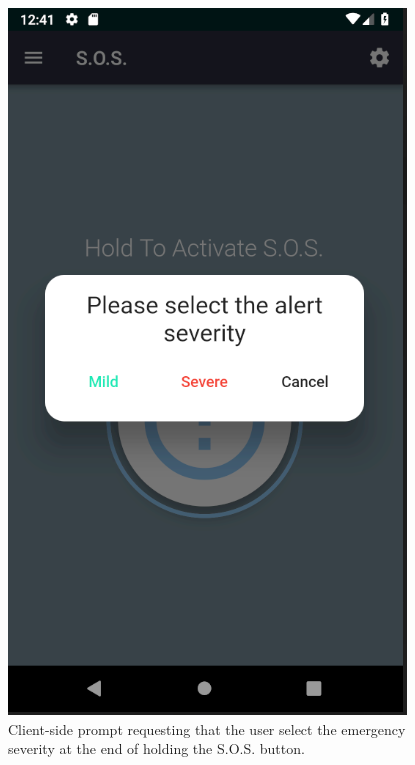 \documentclass[10pt, a4paper]{article}
\begin{document}
\begin{figure}[H]
  \includegraphics[width=\linewidth]{img/severity.PNG}
  \caption{Client-side prompt requesting that the user select the emergency severity at the end of holding the S.O.S. button.}
\endminipage\hfill
{}

\end{figure}
\end{document}

